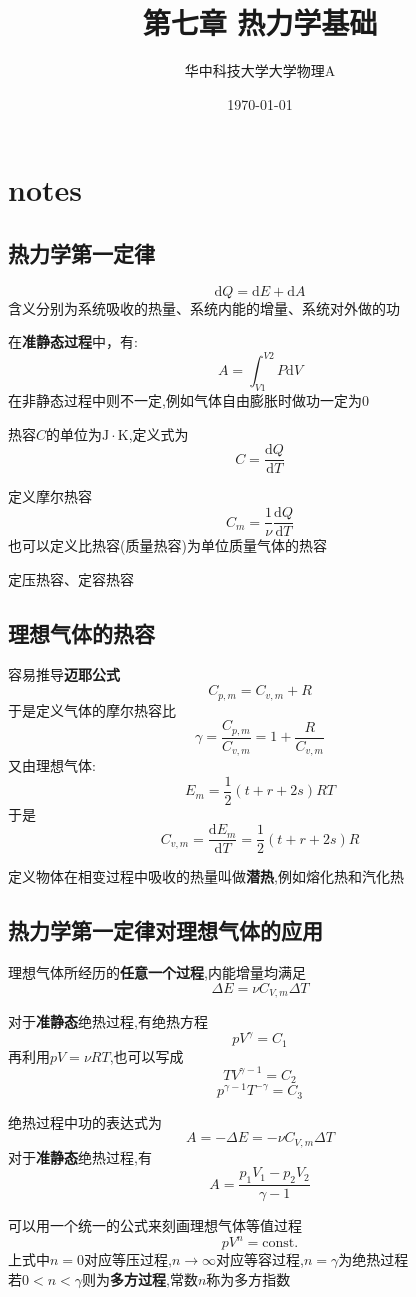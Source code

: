 \documentclass[10pt,a4paper]{article}
\title{第七章 热力学基础}
\author{华中科技大学大学物理A}
\date{\today}
\begin{document}
\maketitle
\section{notes}
\subsection{热力学第一定律}
\[\mathrm{d} Q=\mathrm{d}E+\mathrm{d}A\]
含义分别为系统吸收的热量、系统内能的增量、系统对外做的功

在\textbf{准静态过程}中，有:
\[A=\int_{V1}^{V2} P\mathrm{d}V\]
在非静态过程中则不一定,例如气体自由膨胀时做功一定为0

热容$C$的单位为$\mathrm{J}\cdot\mathrm{K}$,定义式为
\[C=\frac{\mathrm{d}Q}{\mathrm{d}T}\]

定义摩尔热容
\[C_m=\frac{1}{\nu}\frac{\mathrm{d}Q}{\mathrm{d}T}\]
也可以定义比热容(质量热容)为单位质量气体的热容

定压热容、定容热容
\subsection{理想气体的热容}
容易推导\textbf{迈耶公式}
\[\boxed{C_{p,m}=C_{v,m}+R}\]
于是定义气体的摩尔热容比
\[\boxed{\gamma=\frac{C_{p,m}}{C_{v,m}}=1+\frac{R}{C_{v,m}}}\]
又由理想气体:
\[E_m=\frac{1}{2}(t+r+2s)RT\]
于是\[C_{v,m}=\frac{\mathrm{d}E_m}{\mathrm{d}T}=\frac{1}{2}(t+r+2s)R\]

定义物体在相变过程中吸收的热量叫做\textbf{潜热},例如熔化热和汽化热
\subsection{热力学第一定律对理想气体的应用}
理想气体所经历的\textbf{任意一个过程},内能增量均满足
\[\Delta E=\nu C_{V,m}\Delta T\]

对于\textbf{准静态}绝热过程,有绝热方程
\[pV^\gamma=C_1\]
再利用$pV=\nu RT$,也可以写成
\[TV^{\gamma-1}=C_2\]
\[p^{\gamma-1}T^{-\gamma}=C_3\]

绝热过程中功的表达式为\[A=-\Delta E=-\nu C_{V,m}\Delta T\]
对于\textbf{准静态}绝热过程,有
\[A=\frac{p_1V_1-p_2V_2}{\gamma-1}\]

可以用一个统一的公式来刻画理想气体等值过程
\[pV^n=\mathrm{const.}\]
上式中$n=0$对应等压过程,$n\rightarrow\infty$对应等容过程,$n=\gamma$为绝热过程\\
若$0<n<\gamma$则为\textbf{多方过程},常数$n$称为多方指数
\end{document}
